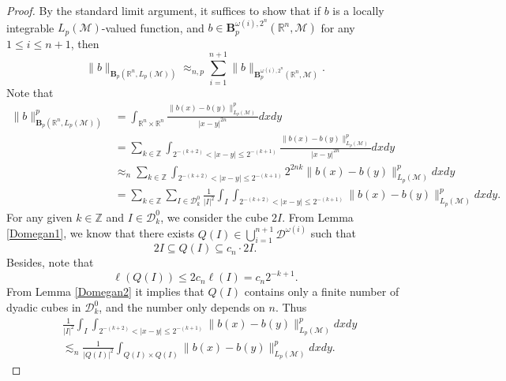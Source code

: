 \documentclass[oneside,english,a4wide]{amsart}
\numberwithin{equation}{section}
\numberwithin{figure}{section}
\theoremstyle{plain}
\theoremstyle{plain}
\theoremstyle{definition}
\theoremstyle{plain}
\theoremstyle{remark}
\theoremstyle{definition}
\theoremstyle{remark}
\theoremstyle{definition}
\newcommand{\M}{{\mathcal M}}
\newcommand{\8}{\infty}
\begin{document}
\begin{proof}
	By the standard limit argument, it suffices to show that if $b$ is a locally integrable $L_p(\M)$-valued function, and $b\in \pmb{B}_p^{\omega(i),2^n}(\mathbb{R}^n,\mathcal{M})$ for any $1\le i\le n+1$, then
	  \begin{equation}\label{hzhang}
		\|b\|_{\pmb{B}_p(\mathbb{R}^n,L_p(\mathcal{M}))}\approx_{n,p} \sum_{i=1}^{n+1} \|b\|_{\pmb{B}_p^{\omega(i),2^n}(\mathbb{R}^n,\mathcal{M})}.
	\end{equation}
	Note that
	\begin{equation*}
		\begin{aligned}
			\|b\|^p_{\pmb{B}_p(\mathbb{R}^n,L_p(\mathcal{M}))}{}&=\int_{\mathbb{R}^n\times\mathbb{R}^n} \frac{\|b(x)-b(y)\|^p_{L_p(\mathcal{M})}}{|x-y|^{2n}}dxdy\\
			&= \sum_{k\in \mathbb{Z}}\int_{2^{-(k+2)}<|x-y|\le 2^{-(k+1)}} \frac{\|b(x)-b(y)\|^p_{L_p(\mathcal{M})}}{|x-y|^{2n}}dxdy\\
			&\approx_{n} \sum_{k\in \mathbb{Z}}\int_{2^{-(k+2)}<|x-y|\le 2^{-(k+1)}} 2^{2nk}\|b(x)-b(y)\|^p_{L_p(\mathcal{M})}dxdy\\
			&=\sum_{k\in \mathbb{Z}}\sum_{I\in \mathcal{D}^0_k}\frac{1}{|I|^2}\int_{I}\int_{2^{-(k+2)}<|x-y|\le 2^{-(k+1)}} \|b(x)-b(y)\|^p_{L_p(\mathcal{M})}dxdy.
		\end{aligned}
	\end{equation*}
	For any given $k\in \mathbb{Z}$ and $I\in\mathcal{D}^0_k$, we consider the cube $2I$. From Lemma \ref{Domegan1}, we know that there exists $Q(I)\in\bigcup\limits_{i=1}^{n+1} \mathcal{D}^{\omega(i)}$ such that
	\begin{equation*}
		2I\subseteq Q(I)\subseteq c_n\cdot 2I.
	\end{equation*}
	Besides, note that
	\begin{equation*}
		\ell(Q(I))\le 2c_n\ell(I)=c_n2^{-k+1}.
	\end{equation*}
From Lemma \ref{Domegan2} it implies that $Q(I)$ contains only a finite number of dyadic cubes in $\mathcal{D}_k^0$, and the number only depends on $n$.
	Thus
	\begin{equation*}
		\begin{aligned}
			{}&\frac{1}{|I|^2}\int_{I}\int_{2^{-(k+2)}<|x-y|\le 2^{-(k+1)}} \|b(x)-b(y)\|^p_{L_p(\mathcal{M})}dxdy\\
			&\lesssim_n \frac{1}{|Q(I)|^2}\int_{Q(I)\times Q(I)} \|b(x)-b(y)\|^p_{L_p(\mathcal{M})}dxdy.
		\end{aligned}
	\end{equation*}

\end{proof}
\end{document}
